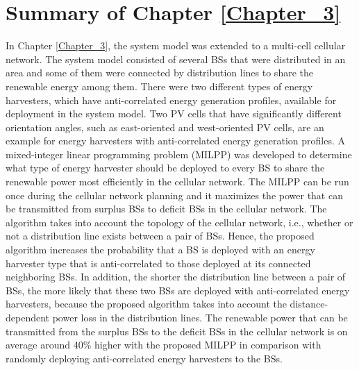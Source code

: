 \section{Summary of Chapter \ref{Chapter_3}\label{sum_Chapter_3}}
In Chapter \ref{Chapter_3}, the system model was extended to a multi-cell cellular network. The system model consisted of several BSs that were distributed in an area and some of them were connected by distribution lines to share the renewable energy among them. There were two different types of energy harvesters, which have anti-correlated energy generation profiles, available for deployment in the system model. Two PV cells that have significantly different orientation angles, such as east-oriented and west-oriented PV cells, are an example for energy harvesters with anti-correlated energy generation profiles.
A mixed-integer linear programming problem (MILPP) was developed to determine what type of energy harvester should be deployed to every BS to share the renewable power most efficiently in the cellular network. The MILPP can be run once during the cellular network planning and it maximizes the power that can be transmitted from surplus BSs to deficit BSs in the cellular network.
The algorithm takes into account the topology of the cellular network, i.e., whether or not a distribution line exists between a pair of
BSs. Hence, the proposed algorithm increases the probability that a BS is deployed with an energy harvester type that is anti-correlated to those deployed at its connected neighboring BSs. In addition, the shorter the distribution line between a pair of BSs, the more likely that these two BSs are deployed with anti-correlated energy harvesters, because the proposed algorithm takes into account the distance-dependent power loss in the distribution lines. 
The renewable power that can be transmitted from the surplus BSs to the deficit BSs in the cellular network is on average around 40\% higher with the proposed MILPP in comparison with randomly deploying anti-correlated energy harvesters to the BSs.



